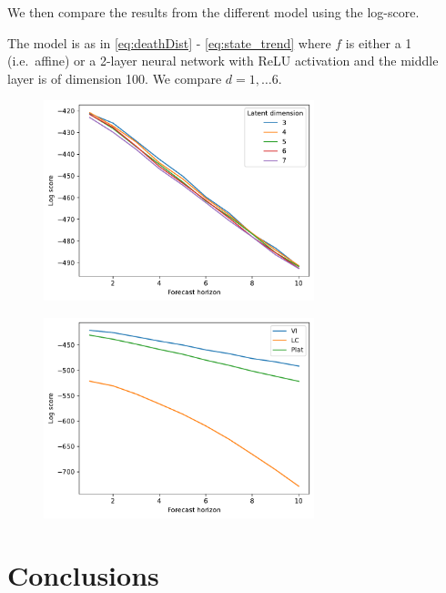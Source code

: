\documentclass[preprint,12pt]{elsarticle}
\begin{document}
We then compare the results from the different model using the log-score.




The model is as in \eqref{eq:deathDist} - \eqref{eq:state_trend} where $f$ is either a 1 (i.e.\ affine) or a 2-layer neural network with ReLU activation and the middle layer is of dimension 100. We compare $d=1,\ldots 6$.

\begin{figure}[hbt]
\begin{center}
  \includegraphics[width=0.7\textwidth]{figs/latent_dim_comparison.pdf}
  \caption{}
  \end{center}
\end{figure}
\begin{figure}[hbt]
\begin{center}
  \includegraphics[width=0.7\textwidth]{figs/model_comparison.pdf}
  \caption{}
  \end{center}
\end{figure}




\section{Conclusions}\label{sec:conclusions}


\end{document}
